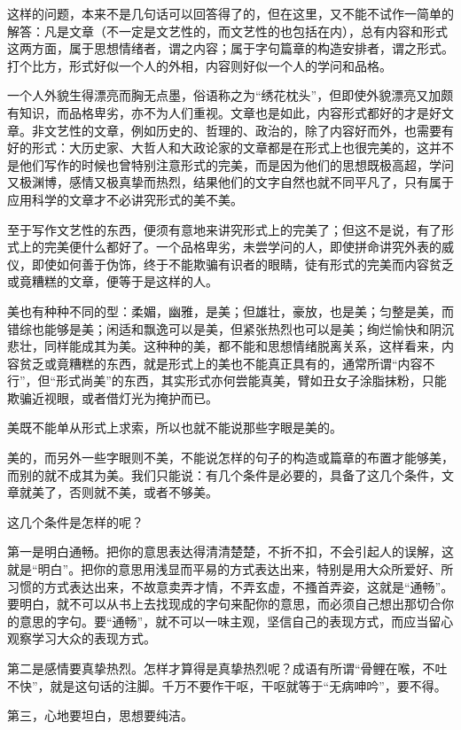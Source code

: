 \documentclass[fontset=fandol,12pt,a5paper]{ctexbook}
\begin{document}
这样的问题，本来不是几句话可以回答得了的，但在这里，又不能不试作一简单的解答：凡是文章（不一定是文艺性的，而文艺性的也包括在内），总有内容和形式这两方面，属于思想情绪者，谓之内容；属于字句篇章的构造安排者，谓之形式。打个比方，形式好似一个人的外相，内容则好似一个人的学问和品格。

一个人外貌生得漂亮而胸无点墨，俗语称之为“绣花枕头”，但即使外貌漂亮又加颇有知识，而品格卑劣，亦不为人们重视。文章也是如此，内容形式都好的才是好文章。非文艺性的文章，例如历史的、哲理的、政治的，除了内容好而外，也需要有好的形式：大历史家、大哲人和大政论家的文章都是在形式上也很完美的，这并不是他们写作的时候也曾特别注意形式的完美，而是因为他们的思想既极高超，学问又极渊博，感情又极真挚而热烈，结果他们的文字自然也就不同平凡了，只有属于应用科学的文章才不必讲究形式的美不美。

至于写作文艺性的东西，便须有意地来讲究形式上的完美了；但这不是说，有了形式上的完美便什么都好了。一个品格卑劣，未尝学问的人，即使拼命讲究外表的威仪，即使如何善于伪饰，终于不能欺骗有识者的眼睛，徒有形式的完美而内容贫乏或竟糟糕的文章，便等于是这样的人。

美也有种种不同的型：柔媚，幽雅，是美；但雄壮，豪放，也是美；匀整是美，而错综也能够是美；闲适和飘逸可以是美，但紧张热烈也可以是美；绚烂愉快和阴沉悲壮，同样能成其为美。这种种的美，都不能和思想情绪脱离关系，这样看来，内容贫乏或竟糟糕的东西，就是形式上的美也不能真正具有的，通常所谓“内容不行”，但“形式尚美”的东西，其实形式亦何尝能真美，臂如丑女子涂脂抹粉，只能欺骗近视眼，或者借灯光为掩护而已。

美既不能单从形式上求索，所以也就不能说那些字眼是美的。

美的，而另外一些字眼则不美，不能说怎样的句子的构造或篇章的布置才能够美，而别的就不成其为美。我们只能说：有几个条件是必要的，具备了这几个条件，文章就美了，否则就不美，或者不够美。

这几个条件是怎样的呢？

第一是明白通畅。把你的意思表达得清清楚楚，不折不扣，不会引起人的误解，这就是“明白”。把你的意思用浅显而平易的方式表达出来，特别是用大众所爱好、所习惯的方式表达出来，不故意卖弄才情，不弄玄虚，不搔首弄姿，这就是“通畅”。要明白，就不可以从书上去找现成的字句来配你的意思，而必须自己想出那切合你的意思的字句。要“通畅”，就不可以一味主观，坚信自己的表现方式，而应当留心观察学习大众的表现方式。

第二是感情要真挚热烈。怎样才算得是真挚热烈呢？成语有所谓“骨鲤在喉，不吐不快”，就是这句话的注脚。千万不要作干呕，干呕就等于“无病呻吟”，要不得。

第三，心地要坦白，思想要纯洁。
\end{document}
